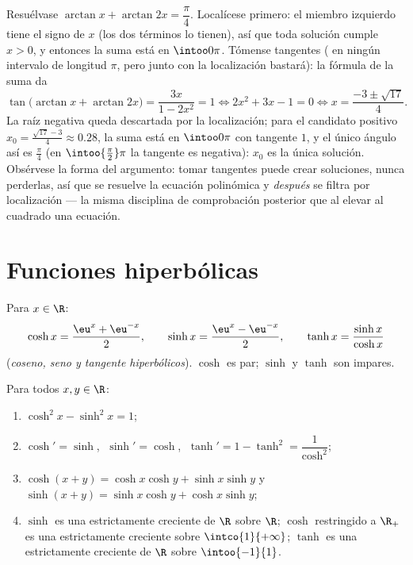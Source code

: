 \begin{example}\label{ex:b1:functions:arctaneq}
Resuélvase $\arctan x + \arctan 2x = \dfrac\pi4$. Localícese primero:
el miembro izquierdo tiene el signo de $x$ (los dos términos lo
tienen), así que toda solución cumple $x > 0$, y entonces la suma está
en $\intoo0\pi$. Tómense tangentes ( en ningún intervalo de
longitud $\pi$, pero junto con la localización bastará): la fórmula de
la suma da
\[
\tan\bigl(\arctan x + \arctan 2x\bigr)
= \frac{3x}{1 - 2x^2} = 1
\iff 2x^2 + 3x - 1 = 0
\iff x = \frac{-3 \pm \sqrt{17}}4 .
\]
La raíz negativa queda descartada por la localización; para el
candidato positivo $x_0 = \frac{\sqrt{17} - 3}4 \approx 0.28$, la suma
está en $\intoo0\pi$ con tangente $1$, y el único ángulo así es
$\frac\pi4$ (en $\intoo{\frac\pi2}\pi$ la tangente es negativa): $x_0$
es la única solución. Obsérvese la forma del argumento: tomar tangentes
puede crear soluciones, nunca perderlas, así que se resuelve la
ecuación polinómica y \emph{después} se filtra por localización --- la
misma disciplina de comprobación posterior que al elevar al cuadrado
una ecuación.
\end{example}

\section{Funciones hiperbólicas}

\begin{definition}[$\cosh$, $\sinh$, $\tanh$]\label{def:b1:functions:hyperbolic}
Para $x \in \R$:
\[
\cosh x = \frac{\eu^x + \eu^{-x}}{2},
\qquad
\sinh x = \frac{\eu^x - \eu^{-x}}{2},
\qquad
\tanh x = \frac{\sinh x}{\cosh x}
\]
(\emph{coseno, seno y tangente hiperbólicos}). $\cosh$ es par; $\sinh$ y $\tanh$ son impares.
\end{definition}

\begin{proposition}\label{prop:b1:functions:hyprules}
Para todos $x, y \in \R$:
\begin{enumerate}
  \item $\cosh^2 x - \sinh^2 x = 1$;
  \item $\cosh' = \sinh$, $\;\sinh' = \cosh$, $\;\tanh' = 1 - \tanh^2
        = \dfrac{1}{\cosh^2}$;
  \item $\cosh(x+y) = \cosh x\cosh y + \sinh x \sinh y$ y
        $\sinh(x+y) = \sinh x \cosh y + \cosh x \sinh y$;
  \item $\sinh$ es una  estrictamente creciente de $\R$ sobre
        $\R$; $\cosh$ restringido a $\R_+$ es una 
        estrictamente creciente sobre $\intco{1}{+\infty}$; $\tanh$ es
        una  estrictamente creciente de $\R$ sobre $\intoo{-1}{1}$.
\end{enumerate}
\end{proposition}

